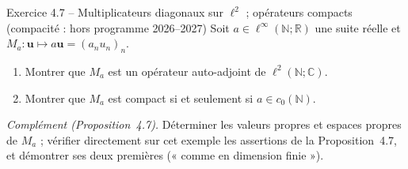 \documentclass[11pt,a4paper]{article}
\newcommand{\R}{\mathbb{R}}
\newcommand{\N}{\mathbb{N}}
\newcommand{\C}{\mathbb{C}}
\theoremstyle{definition}
\begin{document}
\begin{exo}{Exercice 4.7 -- Multiplicateurs diagonaux sur $\ell^2$ ; opérateurs compacts (compacité : hors programme 2026--2027)}
Soit $a\in\ell^\infty(\N;\R)$ une suite réelle et $M_a:\mathbf u\mapsto a\mathbf u=(a_nu_n)_n$.
\begin{enumerate}[label=(\arabic*)]
  \item Montrer que $M_a$ est un opérateur auto-adjoint de $\ell^2(\N;\C)$.
  \item Montrer que $M_a$ est compact si et seulement si $a\in c_0(\N)$.
\end{enumerate}
\emph{Complément (Proposition~4.7).} Déterminer les valeurs propres et espaces propres de $M_a$ ; vérifier directement sur cet exemple les assertions de la Proposition~4.7, et démontrer ses deux premières (« comme en dimension finie »).
\end{exo}
\end{document}
